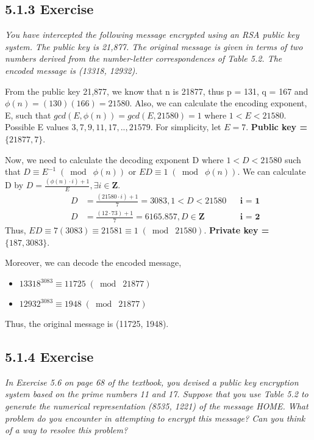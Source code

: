 \documentclass{article}
\begin{document}
\subsection*{5.1.3 Exercise}
\quad \textit{You have intercepted the following message encrypted using an
RSA public key system. The public key is 21,877. The original message is given in
terms of two numbers derived from the number-letter correspondences of Table 5.2.
The encoded message is (13318, 12932).}

From the public key 21,877, we know that n is 21877, thus p = 131, q = 167 and $\phi(n) = (130)(166) = 21580$. Also, we can calculate the encoding exponent, E, such that $gcd(E, \phi(n)) = gcd(E, 21580) = 1$ where $1 < E < 21580$. Possible E values $3,7,9,11,17,..,21579$. For simplicity, let $E = 7$. \textbf{Public key = $\{21877, 7\}$}.

Now, we need to calculate the decoding exponent D where $1 < D < 21580$ such that $D \equiv E^{-1} \;(\bmod\; \phi(n))$ or $ED \equiv 1 \;(\bmod\; \phi(n))$. We can calculate D by $D = \frac{(\phi(n) \cdot i) + 1}{E}, \exists i \in \mathbf{Z}$.
\begin{align*}
    &&D &= \frac{(21580 \cdot i) + 1}{7} = 3083, 1 < D < 21580 && \textbf{i = 1}\\
    &&D &= \frac{(12 \cdot 73) + 1}{7} = 6165.857, D \in \mathbf{Z} && \textbf{i = 2}
\end{align*}
Thus, $ED \equiv 7(3083) \equiv 21581 \equiv 1 \;(\bmod\; 21580)$. \textbf{Private key = $\{187, 3083\}$}.
    
Moreover, we can decode the encoded message,
\begin{itemize}
    \item $13318^{3083} \equiv 11725 \;(\bmod\; 21877)$
    \item $12932^{3083} \equiv 1948 \;(\bmod\; 21877)$
\end{itemize}

Thus, the original message is (11725, 1948).


\subsection*{5.1.4 Exercise}
\quad \textit{In Exercise 5.6 on page 68 of the textbook, you devised a public
key encryption system based on the prime numbers 11 and 17. Suppose that you use
Table 5.2 to generate the numerical representation (8535, 1221) of the message
HOME. What problem do you encounter in attempting to encrypt this message? Can
you think of a way to resolve this problem?}
\end{document}
